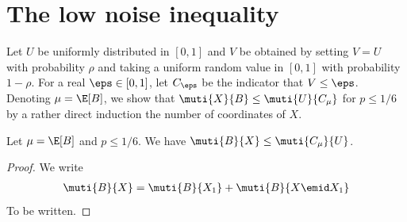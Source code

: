 \label{sec:low-noise}
\section{The low noise inequality}
Let $U$ be uniformly distributed in $[0,1]$ and $V$ be obtained by 
setting $V=U$ with probability $\rho$ and taking a uniform random
value in $[0,1]$ with probability $1-\rho$. For a real $\eps\in[0,1]$,
let $C_\eps$ be the indicator that $V\le\eps$.
Denoting $\mu=\E[B]$, we show that $\muti{X}{B}\le\muti{U}{C_\mu}$
for $p\le 1/6$ by a rather direct induction the number
of coordinates of $X$.

\begin{lemma}
Let $\mu =\E[B]$ and $p\le 1/6$. We have
$\muti{B}{X}\le\muti{C_\mu}{U}$.
\end{lemma}
\begin{proof}
We write
\begin{align*}
\muti{B}{X} = \muti{B}{X_1} + \muti{B}{X\emid X_1}
\end{align*}
To be written.
\end{proof}
